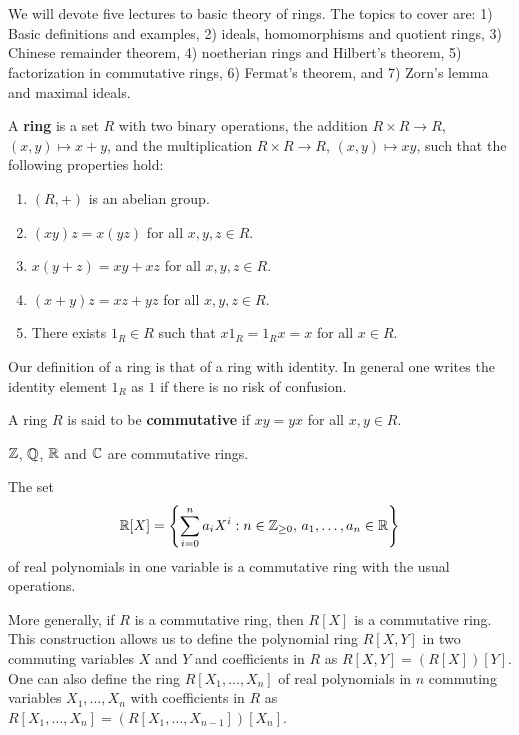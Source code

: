 \chapter{}

We will devote five lectures to basic theory of rings. The topics to cover are:
1) Basic definitions and examples, 2) ideals, homomorphisms and quotient rings,
3) Chinese remainder theorem, 
4) noetherian rings and Hilbert's theorem, 
5) factorization in commutative rings, 
6) Fermat's theorem, and 
7) Zorn's lemma and maximal ideals. 

\begin{definition}
A \textbf{ring} is a set $R$ with two binary operations, the addition
$R\times R\to R$, $(x,y)\mapsto x+y$, and the multiplication
$R\times R\to R$, $(x,y)\mapsto xy$, such that
the following properties hold:
\begin{enumerate}
    \item $(R,+)$ is an abelian group.
    \item $(xy)z=x(yz)$ for all $x,y,z\in R$.
    \item $x(y+z)=xy+xz$ for all $x,y,z\in R$.
    \item $(x+y)z=xz+yz$ for all $x,y,z\in R$.
    \item There exists $1_R\in R$ such that $x1_R=1_Rx=x$ for all $x\in R$.
\end{enumerate}
\end{definition}

Our definition of a ring is that of a ring with identity. In general one
writes the identity element $1_R$ as $1$ if there is no risk of confusion.

\begin{definition}
A ring $R$ is said to be \textbf{commutative} if $xy=yx$ for all $x,y\in R$. 
\end{definition}

\begin{example}
$\mathbb{Z}$, $\mathbb{Q}$, $\mathbb{R}$ and $\mathbb{C}$ are commutative rings.
\end{example}

\begin{example}
    The set  
    \[
		\mathbb{R}[X]=\left\{\sum_{i=0}^na_iX^i:n\in\mathbb{Z}_{\geq0},\,a_1,\dots,a_n\in \mathbb{R}\right\}
    \]
    of real polynomials in one variable 
    is a commutative ring with the usual operations. 
\end{example}

More generally, if $R$ is a commutative ring, then $R[X]$ is a commutative ring. This construction
allows us to define 
the polynomial ring $R[X,Y]$ in two commuting variables $X$ and $Y$ and coefficients in $R$ as 
$R[X,Y]=(R[X])[Y]$. One can also define the ring  
$R[X_1,\dots,X_n]$ of real polynomials 
in $n$ commuting variables $X_1,\dots,X_n$ with coefficients in $R$ as 
$R[X_1,\dots,X_n]
=(R[X_1,\dots,X_{n-1}])[X_n]$.

